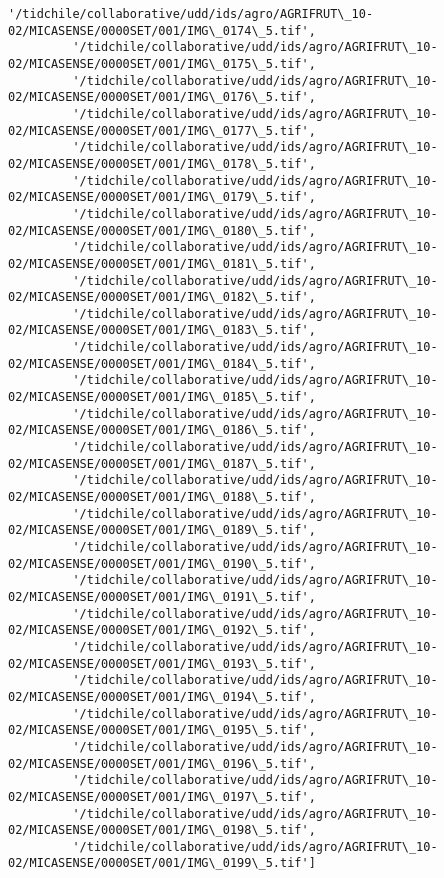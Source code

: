 \documentclass[11pt]{article}
\begin{document}
\begin{Verbatim}[commandchars=\\\{\}]
         '/tidchile/collaborative/udd/ids/agro/AGRIFRUT\_10-02/MICASENSE/0000SET/001/IMG\_0174\_5.tif',
         '/tidchile/collaborative/udd/ids/agro/AGRIFRUT\_10-02/MICASENSE/0000SET/001/IMG\_0175\_5.tif',
         '/tidchile/collaborative/udd/ids/agro/AGRIFRUT\_10-02/MICASENSE/0000SET/001/IMG\_0176\_5.tif',
         '/tidchile/collaborative/udd/ids/agro/AGRIFRUT\_10-02/MICASENSE/0000SET/001/IMG\_0177\_5.tif',
         '/tidchile/collaborative/udd/ids/agro/AGRIFRUT\_10-02/MICASENSE/0000SET/001/IMG\_0178\_5.tif',
         '/tidchile/collaborative/udd/ids/agro/AGRIFRUT\_10-02/MICASENSE/0000SET/001/IMG\_0179\_5.tif',
         '/tidchile/collaborative/udd/ids/agro/AGRIFRUT\_10-02/MICASENSE/0000SET/001/IMG\_0180\_5.tif',
         '/tidchile/collaborative/udd/ids/agro/AGRIFRUT\_10-02/MICASENSE/0000SET/001/IMG\_0181\_5.tif',
         '/tidchile/collaborative/udd/ids/agro/AGRIFRUT\_10-02/MICASENSE/0000SET/001/IMG\_0182\_5.tif',
         '/tidchile/collaborative/udd/ids/agro/AGRIFRUT\_10-02/MICASENSE/0000SET/001/IMG\_0183\_5.tif',
         '/tidchile/collaborative/udd/ids/agro/AGRIFRUT\_10-02/MICASENSE/0000SET/001/IMG\_0184\_5.tif',
         '/tidchile/collaborative/udd/ids/agro/AGRIFRUT\_10-02/MICASENSE/0000SET/001/IMG\_0185\_5.tif',
         '/tidchile/collaborative/udd/ids/agro/AGRIFRUT\_10-02/MICASENSE/0000SET/001/IMG\_0186\_5.tif',
         '/tidchile/collaborative/udd/ids/agro/AGRIFRUT\_10-02/MICASENSE/0000SET/001/IMG\_0187\_5.tif',
         '/tidchile/collaborative/udd/ids/agro/AGRIFRUT\_10-02/MICASENSE/0000SET/001/IMG\_0188\_5.tif',
         '/tidchile/collaborative/udd/ids/agro/AGRIFRUT\_10-02/MICASENSE/0000SET/001/IMG\_0189\_5.tif',
         '/tidchile/collaborative/udd/ids/agro/AGRIFRUT\_10-02/MICASENSE/0000SET/001/IMG\_0190\_5.tif',
         '/tidchile/collaborative/udd/ids/agro/AGRIFRUT\_10-02/MICASENSE/0000SET/001/IMG\_0191\_5.tif',
         '/tidchile/collaborative/udd/ids/agro/AGRIFRUT\_10-02/MICASENSE/0000SET/001/IMG\_0192\_5.tif',
         '/tidchile/collaborative/udd/ids/agro/AGRIFRUT\_10-02/MICASENSE/0000SET/001/IMG\_0193\_5.tif',
         '/tidchile/collaborative/udd/ids/agro/AGRIFRUT\_10-02/MICASENSE/0000SET/001/IMG\_0194\_5.tif',
         '/tidchile/collaborative/udd/ids/agro/AGRIFRUT\_10-02/MICASENSE/0000SET/001/IMG\_0195\_5.tif',
         '/tidchile/collaborative/udd/ids/agro/AGRIFRUT\_10-02/MICASENSE/0000SET/001/IMG\_0196\_5.tif',
         '/tidchile/collaborative/udd/ids/agro/AGRIFRUT\_10-02/MICASENSE/0000SET/001/IMG\_0197\_5.tif',
         '/tidchile/collaborative/udd/ids/agro/AGRIFRUT\_10-02/MICASENSE/0000SET/001/IMG\_0198\_5.tif',
         '/tidchile/collaborative/udd/ids/agro/AGRIFRUT\_10-02/MICASENSE/0000SET/001/IMG\_0199\_5.tif']
\end{Verbatim}
            
\end{document}

